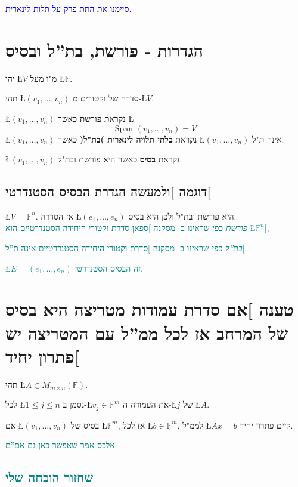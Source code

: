 \documentclass[english,hebrew]{article}
\newcommand{\spn}{\text{Span }}
\begin{document}
\textcolor{blue}{סיימנו את התת-פרק על תלות לינארית.}

\section{הגדרות - פורשת, בת\textquotedblright ל ובסיס}

יהי \L{$V$} מ"ו מעל \L{$\mathbb{F}$}.

תהי \L{$(v_{1},\dots,v_{n})$} סדרה של וקטורים מ-\L{$V$}.

\L{$(v_{1},\dots,v_{n})$} נקראת \textbf{פורשת} כאשר \L{%
\[
\spn(v_{1},\dots,v_{n})=V
\]
}%
\L{$(v_{1},\dots,v_{n})$} נקראת \textbf{בלתי תלויה לינארית )בת"ל(}
כאשר \L{$(v_{1},\dots,v_{n})$} אינה ת"ל.

\L{$(v_{1},\dots,v_{n})$} נקראת \textbf{בסיס} כאשר היא פורשת ובת"ל.

\subsection{דוגמה {]}ולמעשה הגדרת הבסיס הסטנדרטי{[}}

\L{$V=\mathbb{F}^{n}$}. אז הסדרה \L{$(e_{1},\dots,e_{n})$} היא פורשת
ובת"ל ולכן היא בסיס.\\

\textcolor{teal}{\emph{פורשת}}\textcolor{teal}{{} כפי שראינו ב- מסקנה
{]}ספאן סדרת וקטורי היחידה הסטנדרטיים הוא \L{$\mathbb{F}^{n}$}{[},}

\textcolor{teal}{\emph{בת\textquotedblright ל}}\textcolor{teal}{{} כפי
שראינו ב- מסקנה {]}סדרת וקטורי היחידה הסטנדרטיים אינה ת\textquotedblright ל{[}.}

\textcolor{teal}{\L{$E=(e_{1},\dots,e_{n})$} זה הבסיס הסטנדרטי. }

\section{טענה {]}אם סדרת עמודות מטריצה היא בסיס של המרחב אז לכל ממ\textquotedblright ל
עם המטריצה יש פתרון יחיד{[}}

תהי \L{$A\in M_{m\times n}(\mathbb{F})$}.

לכל \L{$1\le j\le n$} נסמן ב-\L{$v_{j}\in\mathbb{F}^{m}$} את העמודה
ה-\L{$j$} של \L{$A$}.

אם \L{$(v_{1},\dots,v_{n})$} בסיס של \L{$\mathbb{F}^{m}$}, אז לכל
\L{$b\in\mathbb{F}^{m}$}, לממ"ל \L{$Ax=b$} קיים פתרון יחיד.

\textcolor{teal}{אלכס אמר שאפשר כאן גם אם\textquotedblright ם.}

\subsection{\textcolor{teal}{שחזור הוכחה שלי}}
\end{document}
